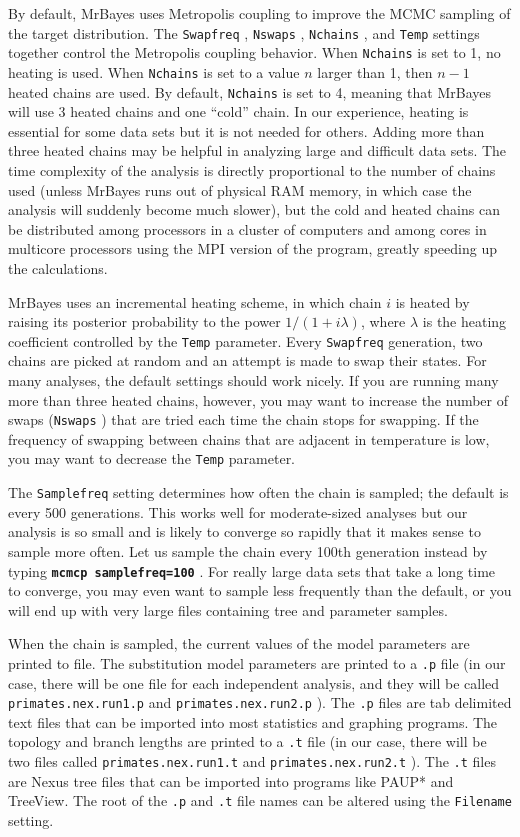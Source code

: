 \documentclass[12pt]{book}
\newcommand{\ttt}[1]{\texttt{#1} }
\newcommand{\tb}[1]{\ttt{\textbf{#1}} }
\begin{document}
By default, MrBayes uses Metropolis coupling to improve the MCMC sampling of the target
distribution. The \ttt{Swapfreq}, \ttt{Nswaps}, \ttt{Nchains}, and \ttt{Temp} settings
together control the Metropolis coupling behavior. When \ttt{Nchains} is set to 1, no heating is
used. When \ttt{Nchains} is set to a value $n$ larger than 1, then $n - 1$ heated chains are
used. By default, \ttt{Nchains} is set to 4, meaning that MrBayes will use 3 heated chains and
one ``cold'' chain. In our experience, heating is essential for some data sets but it is not needed
for others. Adding more than three heated chains may be helpful in analyzing large and difficult
data sets. The time complexity of the analysis is directly proportional to the number of chains
used (unless MrBayes runs out of physical RAM memory, in which case the analysis will suddenly
become much slower), but the cold and heated chains can be distributed among processors in a
cluster of computers and among cores in multicore processors using the MPI version of the program,
greatly speeding up the calculations.

MrBayes uses an incremental heating scheme, in which chain $i$ is heated by raising its posterior
probability to the power $1/ (1 + i\lambda)$, where $\lambda$ is the heating coefficient controlled
by the \ttt{Temp} parameter. Every \ttt{Swapfreq} generation, two chains are picked at random
and an attempt is made to swap their states. For many analyses, the default settings should work
nicely. If you are running many more than three heated chains, however, you may want to increase
the number of swaps (\ttt{Nswaps}) that are tried each time the chain stops for swapping. If the
frequency of swapping between chains that are adjacent in temperature is low, you may want to
decrease the \ttt{Temp} parameter.

The \ttt{Samplefreq} setting determines how often the chain is sampled; the default is every 500
generations. This works well for moderate-sized analyses but our analysis is so small and is likely
to converge so rapidly that it makes sense to sample more often. Let us sample the chain every
100th generation instead by typing \tb{mcmcp samplefreq=100}. For really large data sets that
take a long time to converge, you may even want to sample less frequently than the default, or you
will end up with very large files containing tree and parameter samples.

When the chain is sampled, the current values of the model parameters are printed to file. The
substitution model parameters are printed to a \ttt{.p} file (in our case, there will be one
file for each independent analysis, and they will be called \ttt{primates.nex.run1.p} and
\ttt{primates.nex.run2.p}).  The \ttt{.p} files are tab delimited text files that can be
imported into most statistics and graphing programs. The topology and branch lengths are printed to
a \ttt{.t} file (in our case, there will be two files called \ttt{primates.nex.run1.t} and
\ttt{primates.nex.run2.t}). The \ttt{.t} files are Nexus tree files that can be imported into
programs like PAUP* and TreeView. The root of the \ttt{.p} and \ttt{.t} file names can be
altered using the \ttt{Filename} setting.
\end{document}

